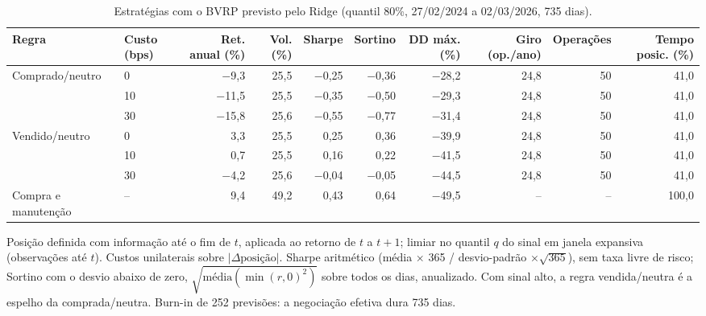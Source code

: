 \begin{table}[H]
\centering
\small
\caption{Estratégias com o BVRP previsto pelo Ridge (quantil 80\%, 27/02/2024 a 02/03/2026, 735 dias).}
\label{tab:A1-principal}
\begin{tabular}{llrrrrrrrr}
\toprule
Regra & Custo (bps) & Ret. anual (\%) & Vol. (\%) & Sharpe & Sortino & DD máx. (\%) & Giro (op./ano) & Operações & Tempo posic. (\%) \\
\midrule
Comprado/neutro & 0 & $-$9{,}3 & 25{,}5 & $-$0{,}25 & $-$0{,}36 & $-$28{,}2 & 24{,}8 & 50 & 41{,}0 \\
 & 10 & $-$11{,}5 & 25{,}5 & $-$0{,}35 & $-$0{,}50 & $-$29{,}3 & 24{,}8 & 50 & 41{,}0 \\
 & 30 & $-$15{,}8 & 25{,}6 & $-$0{,}55 & $-$0{,}77 & $-$31{,}4 & 24{,}8 & 50 & 41{,}0 \\
\midrule
Vendido/neutro & 0 & 3{,}3 & 25{,}5 & 0{,}25 & 0{,}36 & $-$39{,}9 & 24{,}8 & 50 & 41{,}0 \\
 & 10 & 0{,}7 & 25{,}5 & 0{,}16 & 0{,}22 & $-$41{,}5 & 24{,}8 & 50 & 41{,}0 \\
 & 30 & $-$4{,}2 & 25{,}6 & $-$0{,}04 & $-$0{,}05 & $-$44{,}5 & 24{,}8 & 50 & 41{,}0 \\
\midrule
Compra e manutenção & -- & 9{,}4 & 49{,}2 & 0{,}43 & 0{,}64 & $-$49{,}5 & -- & -- & 100{,}0 \\
\bottomrule
\end{tabular}

\par\smallskip\parbox{\linewidth}{\footnotesize Posição definida com informação até o fim de $t$, aplicada ao retorno de $t$ a $t+1$; limiar no quantil $q$ do sinal em janela expansiva (observações até $t$). Custos unilaterais sobre $|\Delta \text{posição}|$. Sharpe aritmético (média $\times$ 365 / desvio-padrão $\times \sqrt{365}$), sem taxa livre de risco; Sortino com o desvio abaixo de zero, $\sqrt{\text{média}(\min(r, 0)^2)}$ sobre todos os dias, anualizado. Com sinal alto, a regra vendida/neutra é a espelho da comprada/neutra. Burn-in de 252 previsões: a negociação efetiva dura 735 dias.}
\end{table}
